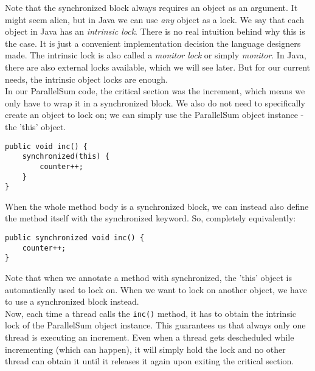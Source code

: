 \documentclass[main.tex]{subfiles}
\begin{document}

Note that the synchronized block always requires an object as an argument. It might seem alien, but in Java we can use \textit{any} object as a lock. We say that each object in Java has an \textit{intrinsic lock}. There is no real intuition behind why this is the case. It is just a convenient implementation decision the language designers made. The intrinsic lock is also called a \textit{monitor lock} or simply \textit{monitor}. In Java, there are also external locks available, which we will see later. But for our current needs, the intrinsic object locks are enough.\\[3mm]
In our ParallelSum code, the critical section was the increment, which means we only have to wrap it in a synchronized block. We also do not need to specifically create an object to lock on; we can simply use the ParallelSum object instance - the 'this' object.
\begin{verbatim}
public void inc() {
    synchronized(this) {
        counter++;
    }
}
\end{verbatim}
When the whole method body is a synchronized block, we can instead also define the method itself with the synchronized keyword. So, completely equivalently:
\begin{verbatim}
public synchronized void inc() {
    counter++;
}
\end{verbatim}
Note that when we annotate a method with synchronized, the 'this' object is automatically used to lock on. When we want to lock on another object, we have to use a synchronized block instead.\\
Now, each time a thread calls the \texttt{inc()} method, it has to obtain the intrinsic lock of the ParallelSum object instance. This guarantees us that always only one thread is executing an increment. Even when a thread gets descheduled while incrementing (which can happen), it will simply hold the lock and no other thread can obtain it until it releases it again upon exiting the critical section.
\end{document}
